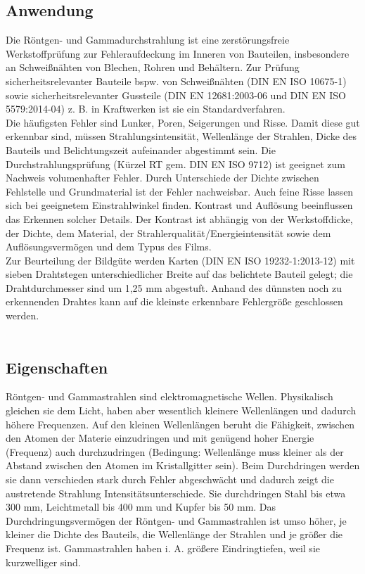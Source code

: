 \subsection{Anwendung}
Die Röntgen- und Gammadurchstrahlung ist eine zerstörungsfreie Werkstoffprüfung zur Fehleraufdeckung im Inneren von Bauteilen, insbesondere an Schweißnähten von Blechen, Rohren und Behältern. Zur Prüfung sicherheitsrelevanter Bauteile bspw. von Schweißnähten (DIN EN ISO 10675-1) sowie sicherheitsrelevanter Gussteile (DIN EN 12681:2003-06 und DIN EN ISO 5579:2014-04) z. B. in Kraftwerken ist sie ein Standardverfahren.\\
Die häufigsten Fehler sind Lunker, Poren, Seigerungen und Risse. Damit diese gut erkennbar sind, müssen Strahlungsintensität, Wellenlänge der Strahlen, Dicke des Bauteils und Belichtungszeit aufeinander abgestimmt sein. Die Durchstrahlungsprüfung (Kürzel RT gem. DIN EN ISO 9712) ist geeignet zum Nachweis volumenhafter Fehler. Durch Unterschiede der Dichte zwischen Fehlstelle und Grundmaterial ist der Fehler nachweisbar. Auch feine Risse lassen sich bei geeignetem Einstrahlwinkel finden. Kontrast und Auflösung beeinflussen das Erkennen solcher Details. Der Kontrast ist abhängig von der Werkstoffdicke, der Dichte, dem Material, der Strahlerqualität/Energieintensität sowie dem Auflösungsvermögen und dem Typus des Films.\\
Zur Beurteilung der Bildgüte werden Karten (DIN EN ISO 19232-1:2013-12) mit sieben Drahtstegen unterschiedlicher Breite auf das belichtete Bauteil gelegt; die Drahtdurchmesser sind um 1,25 mm abgestuft. Anhand des dünnsten noch zu erkennenden Drahtes kann auf die kleinste erkennbare Fehlergröße geschlossen werden.\\
\\
\subsection{Eigenschaften}
Röntgen- und Gammastrahlen sind elektromagnetische Wellen. Physikalisch gleichen sie dem Licht, haben aber wesentlich kleinere Wellenlängen und dadurch höhere Frequenzen. Auf den kleinen Wellenlängen beruht die Fähigkeit, zwischen den Atomen der Materie einzudringen und mit genügend hoher Energie (Frequenz) auch durchzudringen (Bedingung: Wellenlänge muss kleiner als der Abstand zwischen den Atomen im Kristallgitter sein). Beim Durchdringen werden sie dann verschieden stark durch Fehler abgeschwächt und dadurch zeigt die austretende Strahlung Intensitätsunterschiede. Sie durchdringen Stahl bis etwa 300 mm, Leichtmetall bis 400 mm und Kupfer bis 50 mm. Das Durchdringungsvermögen der Röntgen- und Gammastrahlen ist umso höher, je kleiner die Dichte des Bauteils, die Wellenlänge der Strahlen und je größer die Frequenz ist. Gammastrahlen haben i. A. größere Eindringtiefen, weil sie kurzwelliger sind.\\
\\
